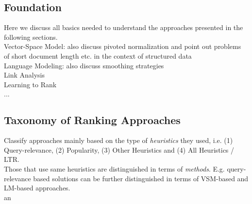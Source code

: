 \subsection{Foundation}
Here we discuss all basics needed to understand the approaches presented in the following sections.\\
Vector-Space Model: also discuss pivoted normalization and point out problems of short document length etc. in the context of structured data\\
Language Modeling: also discuss smoothing strategies\\
Link Analysis\\
Learning to Rank\\
... 

\subsection{Taxonomy of Ranking Approaches}
Classify approaches mainly based on the type of \emph{heuristics} they used, i.e. (1) Query-relevance, (2) Popularity, (3) Other Heuristics and (4) All Heuristics / LTR.\\   

Those that use same heuristics are distinguished in terms of \emph{methods}. E.g. query-relevance based solutions can be further distinguished in terms of VSM-based and LM-based approaches.\\

 
an